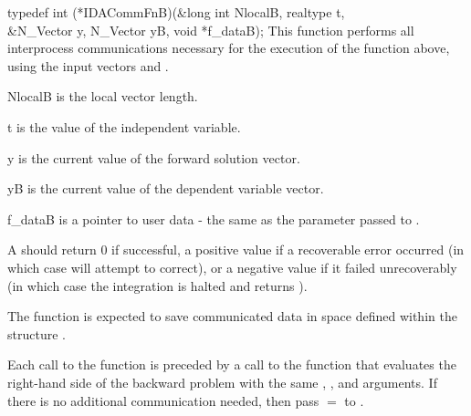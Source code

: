 {
  typedef int (*IDACommFnB)(&long int NlocalB, realtype t,  \\
                           &N\_Vector y, N\_Vector yB, void *f\_dataB);
}
{
  This function performs all interprocess communications necessary 
  for the execution of the  function above, using the input 
  vectors  and .
}
{
  \begin{args}[NlocalB]
  \item[NlocalB] 
    is the local vector length.
  \item[t]
    is the value of the independent variable.
  \item[y]
    is the current value of the forward solution vector.
  \item[yB]
    is the current value of the dependent variable vector.
  \item[f\_dataB]
    is a pointer to user data - the same as the 
    parameter passed to .
  \end{args}
}
{
  A  should return 0 if successful, a positive value if a recoverable
  error occurred (in which case {\idas} will attempt to correct), or a negative 
  value if it failed unrecoverably (in which case the integration is halted and
   returns ). 
}
{
  The  function is expected to save communicated data in space defined within the
  structure . 

  Each call to the  function is preceded by a call to the function that 
  evaluates the right-hand side of the backward problem with the same , , 
  and  arguments. If there is no additional communication needed, then pass
   $=$  to .
}
